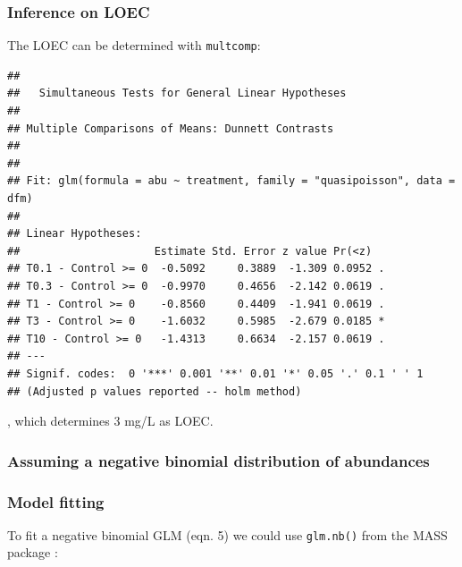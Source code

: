 \subsubsection{Inference on LOEC}
The LOEC can be determined with \texttt{multcomp}:
\begin{knitrout}
\color{fgcolor}\begin{kframe}
\begin{alltt}
\hlstd{(}  \hlstd{=} \hlstd{(} \hlstd{=} \hlstd{),}
              \hlstd{=} \hlstd{),}
         \hlstd{=} \hlstd{(}\hlstd{))}
\end{alltt}
\begin{verbatim}
## 
## 	 Simultaneous Tests for General Linear Hypotheses
## 
## Multiple Comparisons of Means: Dunnett Contrasts
## 
## 
## Fit: glm(formula = abu ~ treatment, family = "quasipoisson", data = dfm)
## 
## Linear Hypotheses:
##                     Estimate Std. Error z value Pr(<z)  
## T0.1 - Control >= 0  -0.5092     0.3889  -1.309 0.0952 .
## T0.3 - Control >= 0  -0.9970     0.4656  -2.142 0.0619 .
## T1 - Control >= 0    -0.8560     0.4409  -1.941 0.0619 .
## T3 - Control >= 0    -1.6032     0.5985  -2.679 0.0185 *
## T10 - Control >= 0   -1.4313     0.6634  -2.157 0.0619 .
## ---
## Signif. codes:  0 '***' 0.001 '**' 0.01 '*' 0.05 '.' 0.1 ' ' 1
## (Adjusted p values reported -- holm method)
\end{verbatim}
\end{kframe}
\end{knitrout}
, which determines 3 mg/L as LOEC.


\subsubsection{Assuming a negative binomial distribution of abundances}
\subsubsection{Model fitting}
To fit a negative binomial GLM (eqn. 5) we could use \texttt{glm.nb()} from the MASS package \citep{venables_modern_2002}:
\begin{knitrout}
\color{fgcolor}\begin{kframe}
\begin{alltt}
 \hlkwb{<-}  \hlopt{~}   
\end{alltt}
\end{kframe}
\end{knitrout}

